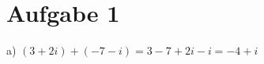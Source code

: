 \documentclass[a4paper, 10pt]{scrartcl}
\begin{document}
\section{Aufgabe 1}

a) $(3 + 2i) + (-7 - i) = 3 - 7 + 2i - i = -4 + i$\\
\end{document}
